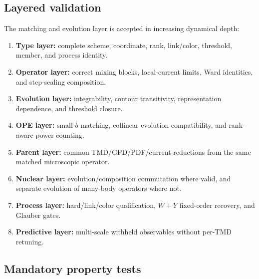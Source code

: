 \documentclass[11pt]{article}
\begin{document}
\subsection{Layered validation}

The matching and evolution layer is accepted in increasing dynamical depth:
\begin{enumerate}
\item \textbf{Type layer:} complete scheme, coordinate, rank, link/color,
      threshold, member, and process identity.
\item \textbf{Operator layer:} correct mixing blocks, local-current limits,
      Ward identities, and step-scaling composition.
\item \textbf{Evolution layer:} integrability, contour transitivity,
      representation dependence, and threshold closure.
\item \textbf{OPE layer:} small-\(b\) matching, collinear evolution
      compatibility, and rank-aware power counting.
\item \textbf{Parent layer:} common TMD/GPD/PDF/current reductions from the
      same matched microscopic operator.
\item \textbf{Nuclear layer:} evolution/composition commutation where valid,
      and separate evolution of many-body operators where not.
\item \textbf{Process layer:} hard/link/color qualification, \(W+Y\)
      fixed-order recovery, and Glauber gates.
\item \textbf{Predictive layer:} multi-scale withheld observables without
      per-TMD retuning.
\end{enumerate}

\subsection{Mandatory property tests}
\end{document}
